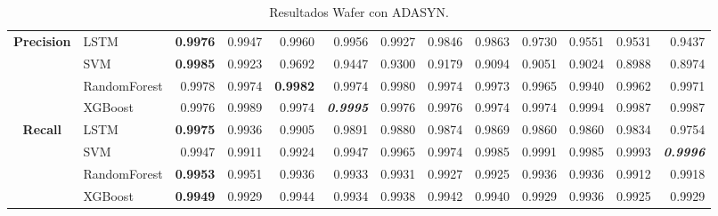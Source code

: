 \begin{table}[H]
\begin{adjustbox}{max width=12cm}
\begin{tabular}{|c|l|r|r|r|r|r|r|r|r|r|r|r|}
			\hline
			\textbf{Precision} &  LSTM & \textbf{  0.9976 } &  0.9947 &  0.9960 &  0.9956 &  0.9927 &  0.9846 &  0.9863 &  0.9730 &  0.9551 &  0.9531 &  0.9437 \\
			&  SVM & \textbf{  0.9985 } &  0.9923 &  0.9692 &  0.9447 &  0.9300 &  0.9179 &  0.9094 &  0.9051 &  0.9024 &  0.8988 &  0.8974 \\
			&  RandomForest &  0.9978 &  0.9974 & \textbf{  0.9982 } &  0.9974 &  0.9980 &  0.9974 &  0.9973 &  0.9965 &  0.9940 &  0.9962 &  0.9971 \\
			&  XGBoost &  0.9976 &  0.9989 &  0.9974 & \textit{ \textbf{  0.9995 } } &  0.9976 &  0.9976 &  0.9974 &  0.9974 &  0.9994 &  0.9987 &  0.9987 \\
			\hline
			\textbf{Recall} &  LSTM & \textbf{  0.9975 } &  0.9936 &  0.9905 &  0.9891 &  0.9880 &  0.9874 &  0.9869 &  0.9860 &  0.9860 &  0.9834 &  0.9754 \\
			&  SVM &  0.9947 &  0.9911 &  0.9924 &  0.9947 &  0.9965 &  0.9974 &  0.9985 &  0.9991 &  0.9985 &  0.9993 & \textit{ \textbf{  0.9996 } } \\
			&  RandomForest & \textbf{  0.9953 } &  0.9951 &  0.9936 &  0.9933 &  0.9931 &  0.9927 &  0.9925 &  0.9936 &  0.9936 &  0.9912 &  0.9918 \\
			&  XGBoost & \textbf{  0.9949 } &  0.9929 &  0.9944 &  0.9934 &  0.9938 &  0.9942 &  0.9940 &  0.9929 &  0.9936 &  0.9925 &  0.9929 \\
			\hline
		\end{tabular}
	\end{adjustbox}
	\caption{Resultados Wafer con ADASYN.}
	\label{tab:Wafer_ADASYN}
\end{table}

